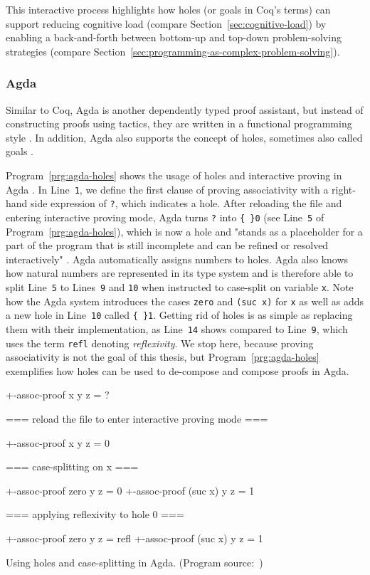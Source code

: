 This interactive process highlights how holes (or goals in Coq's terms) can support reducing cognitive load (compare Section~\ref{sec:cognitive-load}) by enabling a back-and-forth between bottom-up and top-down problem-solving strategies (compare Section~\ref{sec:programming-as-complex-problem-solving}).

\subsubsection{Agda}
Similar to Coq, Agda is another dependently typed proof assistant, but instead of constructing proofs using tactics, they are written in a functional programming style \cite{knispel_agda_2020}.
In addition, Agda also supports the concept of holes, sometimes also called goals \cite{the_agda_team_holes_2023}.

Program~\ref{prg:agda-holes} shows the usage of holes and interactive proving in Agda \cite{the_agda_team_holes_2023}.
In Line~\verb|1|, we define the first clause of proving associativity with a right-hand side expression of \verb|?|, which indicates a hole.
After reloading the file and entering interactive proving mode, Agda turns \verb|?| into \verb|{ }0| (see Line~\verb|5| of Program~\ref{prg:agda-holes}), which is now a hole and "stands as a placeholder for a part of the program that is still incomplete and can be refined or resolved interactively" \cite{the_agda_team_holes_2023}.
Agda automatically assigns numbers to holes.
Agda also knows how natural numbers are represented in its type system and is therefore able to split Line~\verb|5| to Lines~\verb|9| and \verb|10| when instructed to case-split on variable \verb|x|.
Note how the Agda system introduces the cases \verb|zero| and \verb|(suc x)| for \verb|x| as well as adds a new hole in Line~\verb|10| called \verb|{ }1|.
Getting rid of holes is as simple as replacing them with their implementation, as Line~\verb|14| shows compared to Line~\verb|9|, which uses the term \verb|refl| denoting \emph{reflexivity}.
We stop here, because proving associativity is not the goal of this thesis, but Program~\ref{prg:agda-holes} exemplifies how holes can be used to de-compose and compose proofs in Agda.

\begin{program}[ht]
\begin{GenericCode}
+-assoc-proof x y z = ?

=== reload the file to enter interactive proving mode ===

+-assoc-proof x y z = { }0

=== case-splitting on x ===

+-assoc-proof zero y z = {  }0
+-assoc-proof (suc x) y z = {  }1

=== applying reflexivity to hole 0 ===

+-assoc-proof zero y z = refl
+-assoc-proof (suc x) y z = {  }1
\end{GenericCode}
\caption{Using holes and case-splitting in Agda. (Program source:~\cite{the_agda_team_holes_2023})}
\label{prg:agda-holes}
\end{program}

